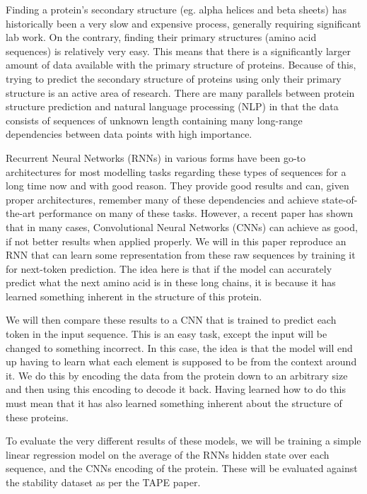 %
Finding a protein's secondary structure (eg. alpha helices and beta sheets) has historically been a very slow and expensive process, generally requiring significant lab work. On the contrary, finding their primary structures (amino acid sequences) is relatively very easy. This means that there is a significantly larger amount of data available with the primary structure of proteins. Because of this, trying to predict the secondary structure of proteins using only their primary structure is an active area of research. There are many parallels between protein structure prediction and natural language processing (NLP) in that the data consists of sequences of unknown length containing many long-range dependencies between data points with high importance. 

Recurrent Neural Networks (RNNs) in various forms have been go-to architectures for most modelling tasks regarding these types of sequences for a long time now and with good reason. They provide good results and can, given proper architectures, remember many of these dependencies and achieve state-of-the-art performance on many of these tasks. However, a recent paper has shown that in many cases, Convolutional Neural Networks (CNNs) can achieve as good, if not better results when applied properly.\cite{intro} We will in this paper reproduce an RNN that can learn some representation from these raw sequences by training it for next-token prediction.\cite{unirep} The idea here is that if the model can accurately predict what the next amino acid is in these long chains, it is because it has learned something inherent in the structure of this protein.

We will then compare these results to a CNN that is trained to predict each token in the input sequence. This is an easy task, except the input will be changed to something incorrect. In this case, the idea is that the model will end up having to learn what each element is supposed to be from the context around it. We do this by encoding the data from the protein down to an arbitrary size and then using this encoding to decode it back. Having learned how to do this must mean that it has also learned something inherent about the structure of these proteins. 

To evaluate the very different results of these models, we will be training a simple linear regression model on the average of the RNNs hidden state over each sequence, and the CNNs encoding of the protein. These will be evaluated against the stability dataset\cite{stability} as per the TAPE paper.\cite{tape}